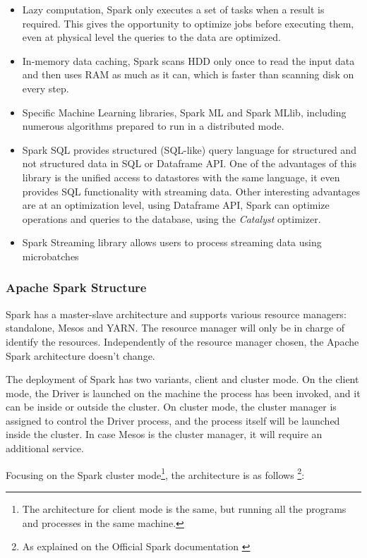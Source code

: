 \documentclass[11pt]{article} %
\begin{document}
    \begin{itemize}
      \item Lazy computation, Spark only executes a set of tasks when a result is required. This gives the opportunity to optimize jobs before executing them, even at physical level the queries to the data are optimized.
      \item In-memory data caching, Spark scans HDD only once to read the input data and then uses RAM as much as it can, which is faster than scanning disk on every step.
      \item Specific Machine Learning libraries, Spark ML and Spark MLlib, including numerous algorithms prepared to run in a distributed mode.
      \item Spark SQL provides structured (SQL-like) query language for structured and not structured data in SQL or Dataframe API. One of the advantages of this library is the unified access to datastores with the same language, it even provides SQL functionality with streaming data. Other interesting advantages are at an optimization level, using Dataframe API, Spark can optimize operations and queries to the database, using the \emph{Catalyst} optimizer.
      \item Spark Streaming library allows users to process streaming data using microbatches
    \end{itemize}

    \subsubsection{Apache Spark Structure}

      Spark has a master-slave architecture and supports various resource managers: standalone, Mesos and YARN. The resource manager will only be in charge of identify the resources. Independently of the resource manager chosen, the Apache Spark architecture doesn't change.

      The deployment of Spark has two variants, client and cluster mode. On the client mode, the Driver is launched on the machine the process has been invoked, and it can be inside or outside the cluster. On cluster mode, the cluster manager is assigned to control the Driver process, and the process itself will be launched inside the cluster. In case Mesos is the cluster manager, it will require an additional service.

      Focusing on the Spark cluster mode\footnote{The architecture for client mode is the same, but running all the programs and processes in the same machine.}, the architecture is as follows \footnote{As explained on the Official Spark documentation \cite{spark_documentation}}:
\end{document}
